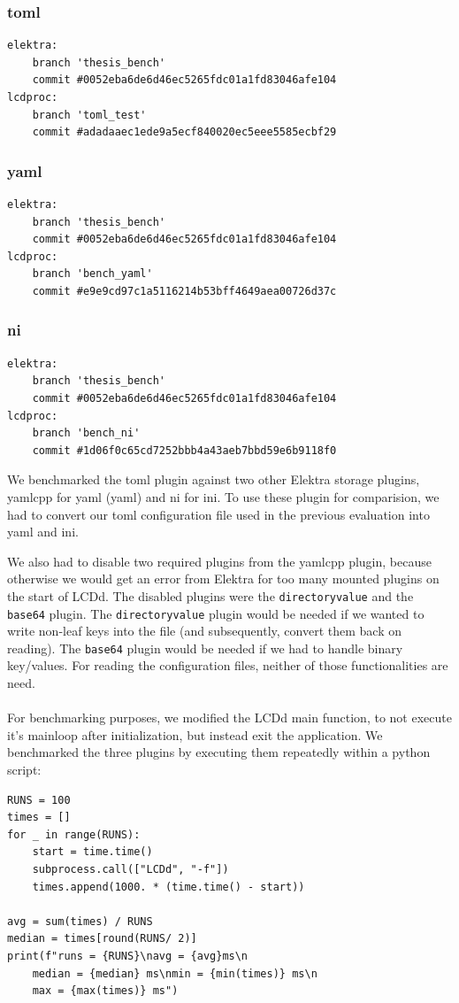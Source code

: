\documentclass[draft,final]{vutinfth} %
\begin{document}
\subsubsection{\acrshort{toml}}
\begin{Verbatim}[frame=single, fontsize=\small]
elektra:
    branch 'thesis_bench'
    commit #0052eba6de6d46ec5265fdc01a1fd83046afe104
lcdproc:
    branch 'toml_test'
    commit #adadaaec1ede9a5ecf840020ec5eee5585ecbf29
\end{Verbatim}
\subsubsection{\acrshort{yaml}}
\begin{Verbatim}[frame=single, fontsize=\small]
elektra:
    branch 'thesis_bench'
    commit #0052eba6de6d46ec5265fdc01a1fd83046afe104
lcdproc:
    branch 'bench_yaml'
    commit #e9e9cd97c1a5116214b53bff4649aea00726d37c
\end{Verbatim}

\subsubsection{ni}
\begin{Verbatim}[frame=single, fontsize=\small]
elektra:
    branch 'thesis_bench'
    commit #0052eba6de6d46ec5265fdc01a1fd83046afe104
lcdproc:
    branch 'bench_ni'
    commit #1d06f0c65cd7252bbb4a43aeb7bbd59e6b9118f0
\end{Verbatim}

We benchmarked the \acrshort{toml} plugin against two other Elektra storage plugins, yamlcpp for \acrshort{yaml} (\acrlong{yaml}) and ni for \acrshort{ini}.
To use these plugin for comparision, we had to convert our \acrshort{toml} configuration file used in the previous evaluation into \acrshort{yaml} and \acrshort{ini}.

We also had to disable two required plugins from the yamlcpp plugin, because otherwise we would get an error from Elektra for too many mounted plugins on the start of LCDd.
The disabled plugins were the \texttt{directoryvalue} and the \texttt{base64} plugin.
The \texttt{directoryvalue} plugin would be needed if we wanted to write non-leaf keys into the file (and subsequently, convert them back on reading).
The \texttt{base64} plugin would be needed if we had to handle binary key/values.
For reading the configuration files, neither of those functionalities are need.
\\\\
For benchmarking purposes, we modified the LCDd main function, to not execute it's mainloop after initialization, but instead exit the application.
We benchmarked the three plugins by executing them repeatedly within a python script:
\begin{Verbatim}[frame=single, fontsize=\small]
RUNS = 100
times = []
for _ in range(RUNS):
	start = time.time()
	subprocess.call(["LCDd", "-f"])
	times.append(1000. * (time.time() - start))

avg = sum(times) / RUNS
median = times[round(RUNS/ 2)]
print(f"runs = {RUNS}\navg = {avg}ms\n
    median = {median} ms\nmin = {min(times)} ms\n
    max = {max(times)} ms")
\end{Verbatim}
\end{document}
